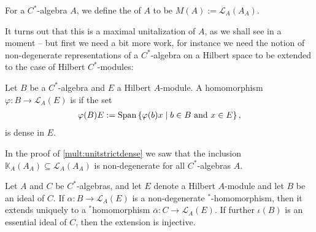 \begin{definition}
	For a $C^*$-algebra $A$, we define the  of $A$ to be $M(A):=\mathcal{L}_A(A_A)$.
\end{definition}
It turns out that this is a maximal unitalization of $A$, as we shall see in a moment -- but first we need a bit more work, for instance we need the notion of non-degenerate representations of a $C^*$-algebra on a Hilbert space to be extended to the case of Hilbert $C^*$-modules:
\begin{definition}
	Let $B$ be a $C^*$-algebra and $E$ a Hilbert $A$-module. A homomorphism $\varphi \colon B \to \mathcal{L}_A(E)$ is  if the set
	\begin{align*}
		\varphi(B)E:= \mathrm{Span}\left\{ \varphi(b)x \mid b \in B  \text{ and } x \in E \right\},
	\end{align*}
	is dense in $E$. 
\end{definition}
\begin{example}
	In the proof of \ref{mult:unitstrictdense} we saw that the inclusion $\mathbb{K}_A(A_A) \subseteq \mathcal{L}_A(A_A)$ is non-degenerate for all $C^*$-algebras $A$.
	\label{mult:compnondeg}
\end{example}
\begin{proposition}
	Let $A$ and $C$ be $C^*$-algebras, and let $E$ denote a Hilbert $A$-module and let $B$ be an ideal of $C$. If $\alpha \colon B \to \mathcal{L}_A(E)$ is a non-degenerate  $^*$-homomorphism, then it extends uniquely to a $^*$homomorphism $\overline \alpha \colon C \to \mathcal{L}_A(E)$. If further $\iota(B)$ is an essential ideal of $C$, then the extension is injective. 
	\label{mult:uniqueext}
\end{proposition}
